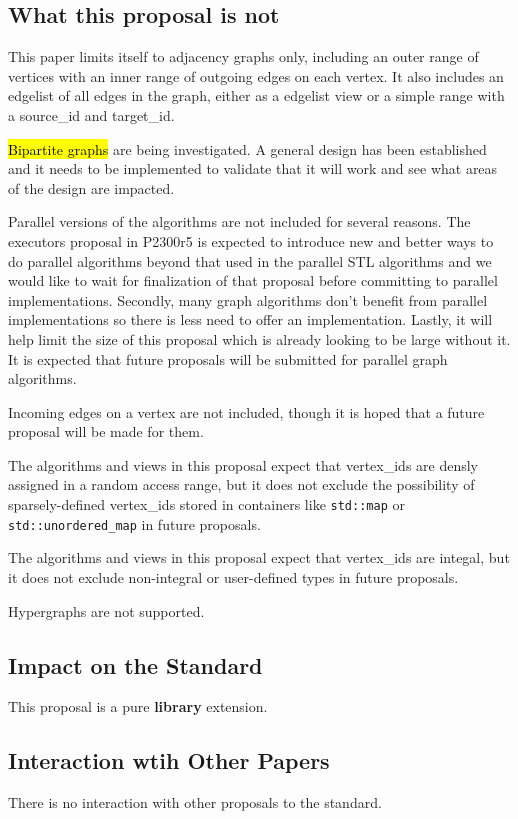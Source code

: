 \documentclass[10pt,onecolumn]{article}
\newcommand{\tcode}[1]{\lstinline[breaklines=true]{#1}}
\begin{document}
\subsection{What this proposal is  \textbf{not}}
This paper limits itself to adjacency graphs only, including an outer range of vertices with an inner range of outgoing edges on each vertex. It also includes an edgelist of all edges in the graph, either as a edgelist view or a simple range with a source\_id and target\_id. 

\hl{Bipartite graphs} are being investigated. A general design has been established and it needs to be implemented to validate that it will work and see what areas of the design are impacted.

Parallel versions of the algorithms are not included for several reasons. The executors proposal in P2300r5 \cite{REF_P2300r5} is expected to introduce new and better ways to do parallel algorithms beyond that used in the parallel STL algorithms and we would like to wait for finalization of that proposal before committing to parallel implementations. Secondly, many graph algorithms don't benefit from parallel implementations so there is less need to offer an implementation. Lastly, it will help limit the size of this proposal which is already looking to be large without it. It is expected that future proposals will be submitted for parallel graph algorithms. 

Incoming edges on a vertex are not included, though it is hoped that a future proposal will be made for them.

The algorithms and views in this proposal expect that vertex\_ids are densly assigned in a random access range, but it does not exclude the possibility of sparsely-defined vertex\_ids stored in containers like \tcode{std::map} or \tcode{std::unordered_map} in future proposals. 

The algorithms and views in this proposal expect that vertex\_ids are integal, but it does not exclude non-integral or user-defined types in future proposals.

Hypergraphs are not supported.

\subsection{Impact on the Standard}
This proposal is a pure \textbf{library} extension.

\subsection{Interaction wtih Other Papers}
There is no interaction with other proposals to the standard.
\end{document}
